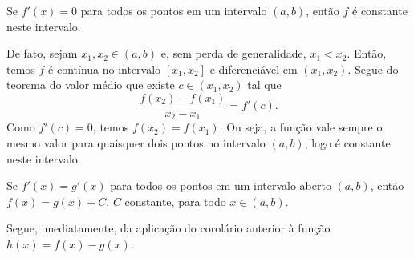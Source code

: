\begin{corol}
  Se $f'(x)=0$ para todos os pontos em um intervalo $(a, b)$, então $f$ é constante neste intervalo.
\end{corol}
\begin{dem}
  De fato, sejam $x_1,x_2\in (a, b)$ e, sem perda de generalidade, $x_1<x_2$. Então, temos $f$ é contínua no intervalo $[x_1,x_2]$ e diferenciável em $(x_1,x_2)$. Segue do teorema do valor médio que existe $c\in (x_1,x_2)$ tal que
  \begin{equation}
    \frac{f(x_2)-f(x_1)}{x_2-x_1}=f'(c).
  \end{equation}
  Como $f'(c)=0$, temos $f(x_2)=f(x_1)$. Ou seja, a função vale sempre o mesmo valor para quaisquer dois pontos no intervalo $(a, b)$, logo é constante neste intervalo.
\end{dem}

\begin{corol}\label{corol:apderiv_teomed_2}
  Se $f'(x)=g'(x)$ para todos os pontos em um intervalo aberto $(a,b)$, então $f(x)=g(x)+C$, $C$ constante, para todo $x\in (a,b)$.
\end{corol}
\begin{dem}
  Segue, imediatamente, da aplicação do corolário anterior à função $h(x)=f(x)-g(x)$.
\end{dem}

